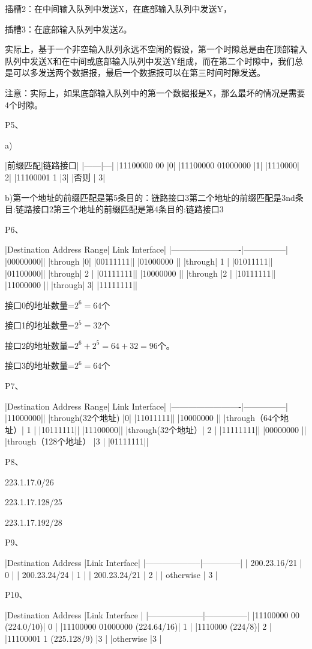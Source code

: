 \documentclass[11pt,UTF8,twoside]{article}
\begin{document}
	插槽2：在中间输入队列中发送X，在底部输入队列中发送Y，
	
	插槽3：在底部输入队列中发送Z。
	
	实际上，基于一个非空输入队列永远不空闲的假设，第一个时隙总是由在顶部输入队列中发送X和在中间或底部输入队列中发送Y组成，而在第二个时隙中，我们总是可以多发送两个数据报，最后一个数据报可以在第三时间时隙发送。
	
	注意：实际上，如果底部输入队列中的第一个数据报是X，那么最坏的情况是需要4个时隙。
	
	P5、
	
	a)
	
	|前缀匹配|链路接口|
	|------|---|
	|11100000 00 |0|
	|11100000 01000000 |1|
	|1110000| 2|
	|11100001 1 |3|
	|否则 | 3|
	
	b)第一个地址的前缀匹配是第5条目的：链路接口3第二个地址的前缀匹配是3nd条目:链路接口2第三个地址的前缀匹配是第4条目的:链路接口3
	
	P6、
	
	|Destination Address Range| Link Interface|
	|-------------------------|---------------|
	|00000000|| 
	|through |0| 
	|00111111|| 
	|01000000 ||
	|through| 1 |
	|01011111|| 
	|01100000|| 
	|through| 2 |
	|01111111|| 
	|10000000 ||
	|through |2 |
	|10111111|| 
	|11000000 ||
	|through| 3| 
	|11111111|| 
	
	接口0的地址数量=$2^6=64$个
	
	接口1的地址数量=$2^5=32$个
	
	接口2的地址数量=$2^6+2^5=64+32=96$个。
	
	接口3的地址数量=$2^6=64$个
	
	P7、
	
	|Destination Address Range| Link Interface|
	|-------------------------|---------------|
	|11000000|| 
	|through(32个地址) |0| 
	|11011111|| 
	|10000000 ||
	|through（64个地址）| 1 |
	|10111111|| 
	|11100000|| 
	|through(32个地址）| 2 |
	|11111111|| 
	|00000000 ||
	|through（128个地址） |3 |
	|01111111|| 
	
	P8、
	
	223.1.17.0/26 
	
	223.1.17.128/25 
	
	223.1.17.192/28 
	
	P9、
	
	|Destination Address |Link Interface| 
	|--------------------|--------------|
	| 200.23.16/21 | 0 | 
	| 200.23.24/24 | 1 | 
	| 200.23.24/21 | 2 | 
	| otherwise | 3 | 
	
	P10、
	
	|Destination Address |Link Interface |
	|--------------------|---------------|
	|11100000 00 (224.0/10)| 0 |
	|11100000 01000000 (224.64/16)| 1 |
	|1110000 (224/8)| 2 |
	|11100001 1 (225.128/9) |3 |
	|otherwise |3 |
	
\end{document}

